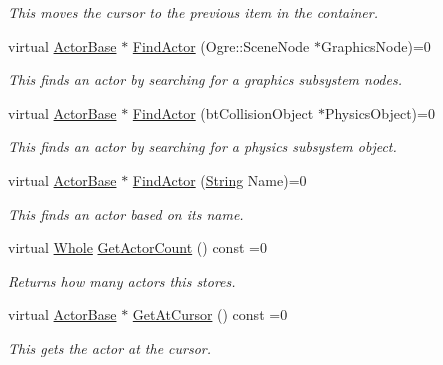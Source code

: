 \begin{DoxyCompactItemize}
\begin{DoxyCompactList}\small\item\em This moves the cursor to the previous item in the container. \item\end{DoxyCompactList}\item 
virtual \hyperlink{classphys_1_1ActorBase}{ActorBase} $\ast$ \hyperlink{classphys_1_1ActorContainerBase_a1ade0001858f87ce1843cc6f6ec4e1c0}{FindActor} (Ogre::SceneNode $\ast$GraphicsNode)=0
\begin{DoxyCompactList}\small\item\em This finds an actor by searching for a graphics subsystem nodes. \item\end{DoxyCompactList}\item 
virtual \hyperlink{classphys_1_1ActorBase}{ActorBase} $\ast$ \hyperlink{classphys_1_1ActorContainerBase_a9ba6e38e0f12ada968cfee72fe5144d4}{FindActor} (btCollisionObject $\ast$PhysicsObject)=0
\begin{DoxyCompactList}\small\item\em This finds an actor by searching for a physics subsystem object. \item\end{DoxyCompactList}\item 
virtual \hyperlink{classphys_1_1ActorBase}{ActorBase} $\ast$ \hyperlink{classphys_1_1ActorContainerBase_a91223cbaebb8e5f11a4f971d7e5b64b6}{FindActor} (\hyperlink{namespacephys_aa03900411993de7fbfec4789bc1d392e}{String} Name)=0
\begin{DoxyCompactList}\small\item\em This finds an actor based on its name. \item\end{DoxyCompactList}\item 
virtual \hyperlink{namespacephys_a460f6bc24c8dd347b05e0366ae34f34a}{Whole} \hyperlink{classphys_1_1ActorContainerBase_aa5ec651d4634b2d90efe2a76f9d2fbdd}{GetActorCount} () const =0
\begin{DoxyCompactList}\small\item\em Returns how many actors this stores. \item\end{DoxyCompactList}\item 
virtual \hyperlink{classphys_1_1ActorBase}{ActorBase} $\ast$ \hyperlink{classphys_1_1ActorContainerBase_a2c8fb86a9e188aece105b2a753ccc19a}{GetAtCursor} () const =0
\begin{DoxyCompactList}\small\item\em This gets the actor at the cursor. \item\end{DoxyCompactList}\item 

\end{DoxyCompactItemize}
